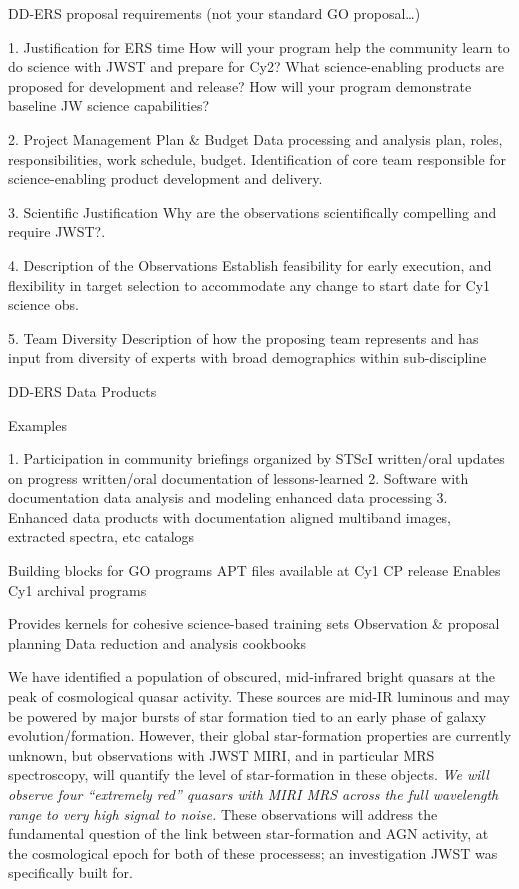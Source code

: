 
DD-ERS proposal requirements (not your standard GO proposal…)

1. Justification for ERS time
    How will your program help the community learn to do science with JWST
    and prepare for Cy2?  What science-enabling products are proposed for
    development and release? How will your program demonstrate baseline JW
    science capabilities?
    
2. Project Management Plan \& Budget
    Data processing and analysis plan, roles, responsibilities, work
    schedule, budget. Identification of core team responsible for
    science-enabling product development and delivery.

3. Scientific Justification
    Why are the observations scientifically compelling and require JWST?.

4. Description of the Observations
    Establish feasibility for early execution, and flexibility in
    target selection to accommodate any change to start date for Cy1
    science obs.

5. Team Diversity
    Description of how the proposing team represents and has input
    from diversity of experts with broad demographics within
    sub-discipline
	

DD-ERS Data Products

Examples

1.	Participation in community briefings organized by STScI
written/oral updates on progress
written/oral documentation of lessons-learned
2.	Software with documentation
data analysis and modeling
enhanced data processing
3.	Enhanced data products with documentation
aligned multiband images, extracted spectra, etc
catalogs

Building blocks for GO programs 
APT files available at Cy1 CP release
Enables Cy1 archival programs

Provides kernels for cohesive science-based training sets 
Observation & proposal planning
Data reduction and analysis cookbooks










We have identified a population of obscured, mid-infrared bright
quasars at the peak of cosmological quasar activity.  These sources are
mid-IR luminous and may be powered by major bursts of star formation
tied to an early phase of galaxy evolution/formation. However, their
global star-formation properties are currently unknown, but
observations with JWST MIRI, and in particular MRS spectroscopy, will
quantify the level of star-formation in these objects.  {\it We will
observe four ``extremely red'' quasars with MIRI MRS across the full wavelength range to
very high signal to noise.} These observations will address the
fundamental question of the link between star-formation and AGN
activity, at the cosmological epoch for both of these processess; an
investigation JWST was specifically built for.

